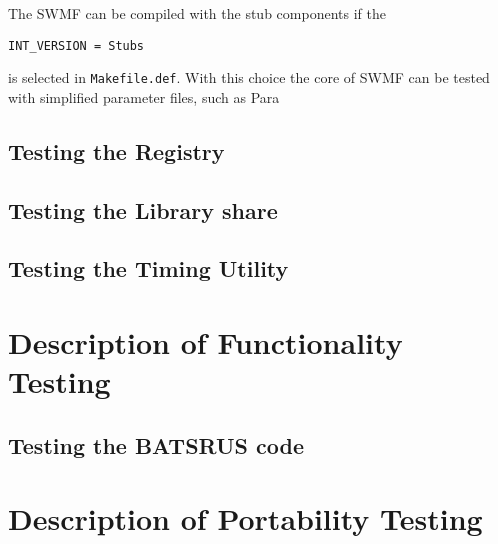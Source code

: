 \documentclass[twoside,10pt]{report}
\begin{document}
The SWMF can be compiled with the stub components if the 
\begin{verbatim}
INT_VERSION = Stubs
\end{verbatim}
is selected in {\tt Makefile.def}. With this choice the core
of SWMF can be tested with simplified parameter files,
such as Para

\section{Testing the Registry}

\section{Testing the Library share}

\section{Testing the Timing Utility}

\chapter{Description of Functionality Testing}

\section{Testing the BATSRUS code}

\chapter{Description of Portability Testing}
\end{document}
